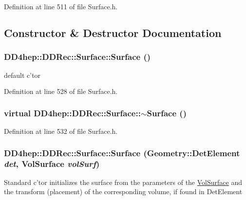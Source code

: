 Definition at line 511 of file Surface.h.

\subsection{Constructor \& Destructor Documentation}
\hypertarget{class_d_d4hep_1_1_d_d_rec_1_1_surface_a9cbdd49c7183347839f20c80c114f0b6}{
\subsubsection[{Surface}]{\setlength{\rightskip}{0pt plus 5cm}DD4hep::DDRec::Surface::Surface ()}}
\label{class_d_d4hep_1_1_d_d_rec_1_1_surface_a9cbdd49c7183347839f20c80c114f0b6}


default c'tor 

Definition at line 528 of file Surface.h.\hypertarget{class_d_d4hep_1_1_d_d_rec_1_1_surface_aa336356bfc2c272c65b7fae46688dad5}{
\subsubsection[{$\sim$Surface}]{\setlength{\rightskip}{0pt plus 5cm}virtual DD4hep::DDRec::Surface::$\sim$Surface ()}}
\label{class_d_d4hep_1_1_d_d_rec_1_1_surface_aa336356bfc2c272c65b7fae46688dad5}


Definition at line 532 of file Surface.h.\hypertarget{class_d_d4hep_1_1_d_d_rec_1_1_surface_a1a4cca5bac129f897331f1df355c75d0}{
\subsubsection[{Surface}]{\setlength{\rightskip}{0pt plus 5cm}DD4hep::DDRec::Surface::Surface ({\bf Geometry::DetElement} {\em det}, \/  {\bf VolSurface} {\em volSurf})}}
\label{class_d_d4hep_1_1_d_d_rec_1_1_surface_a1a4cca5bac129f897331f1df355c75d0}
Standard c'tor initializes the surface from the parameters of the \hyperlink{class_d_d4hep_1_1_d_d_rec_1_1_vol_surface}{VolSurface} and the transform (placement) of the corresponding volume, if found in DetElement 

